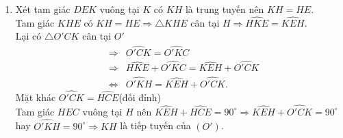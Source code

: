 \begin{vd}
{\begin{enumerate}
			Chứng minh tương tự ta có $\widehat{ADB}= 90^\circ$ hay $AD\perp BD$. $\hfill (2)$\\
			Từ $(1)$và $(2)\Rightarrow CK\parallel AD$.\\
			Lại có $CE\parallel AD$ (vì tứ giác $ADCE$ là hình thoi)
			$\Rightarrow C$, $E$, $K$ thẳng hàng.
			\item Xét tam giác $DEK$ vuông tại $K$ có $KH$ là trung tuyến nên $KH = HE$.\\
			Tam giác $KHE$ có $KH = HE \Rightarrow \triangle KHE$ cân tại $H\Rightarrow \widehat{HKE}=\widehat{KEH}$.\\
			Lại có $\triangle O'CK$ cân tại $O'$ 
			\begin{eqnarray*}
				&\Rightarrow& \widehat{O'CK}=\widehat{O'KC}\\
				&\Rightarrow& \widehat{HKE}+ \widehat{O'KC}=\widehat{KEH}+ \widehat{O'CK}\\
				&\Leftrightarrow& \widehat{O'KH}= \widehat{KEH}+ \widehat{O'CK}.
			\end{eqnarray*}
			Mặt khác $\widehat{O'CK}= \widehat{HCE}$(đối đỉnh)\\
			Tam giác $HEC$ vuông tại $H$ nên $\widehat{KEH}+ \widehat{HCE}= 90^\circ\Rightarrow\widehat{KEH}+ \widehat{O'CK}= 90^\circ$
			hay $\widehat{O'KH}= 90^\circ\Rightarrow KH$ là tiếp tuyến của $(O')$.
		\end{enumerate}
	}
\end{vd}

